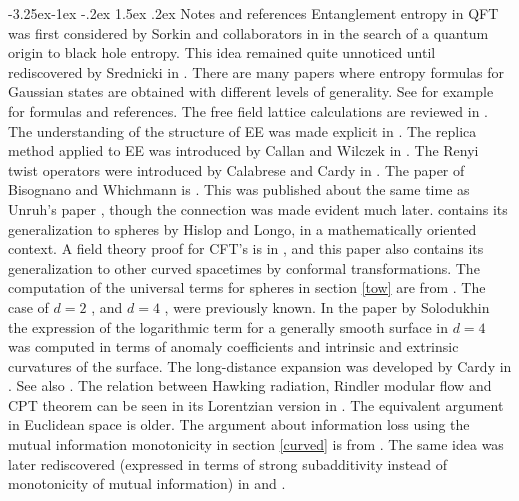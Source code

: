 \documentclass[11pt,a4paper]{article}
\makeatletter
\renewcommand\subsection{\@startsection{subsection}{2}{\z@}%
                                   {-3.25ex\@plus -1ex \@minus -.2ex}%
                                     {1.5ex \@plus .2ex}%
                                     {\normalfont\bfseries}}
\numberwithin{equation}{section}
\makeatother
\begin{document}
\subsection{Notes and references}
Entanglement entropy in QFT was first considered by Sorkin and collaborators in \cite{Sorkin:2014kta,Bombelli:1986rw} in the search of a quantum origin to black hole entropy. This idea remained quite unnoticed until rediscovered by Srednicki in \cite{Srednicki:1993im}. 
There are many papers where entropy formulas for Gaussian states are obtained with different levels of generality. See for example  \cite{peschel2009reduced} for formulas and references. 
The free field lattice calculations are reviewed in \cite{Casini:2009sr}. The understanding of the structure of EE was made explicit in  \cite{Liu:2012eea,Grover:2011fa}. The replica method applied to EE was introduced by Callan and Wilczek in \cite{Callan:1994py}. The Renyi twist operators were introduced by Calabrese and Cardy in \cite{Calabrese:2004eu}. The paper of Bisognano and Whichmann 
 is \cite{Bisognano:1975ih}. This was published about the same time as Unruh's paper  \cite{unruh1976notes}, though the connection was made evident much later.  
 \cite{Hislop:1981uh} contains its generalization to spheres by Hislop and Longo, in a mathematically oriented context. A field theory proof for CFT's is in \cite{Casini:2011kv}, and this paper also contains its generalization to other curved spacetimes by conformal transformations. The computation of the universal terms for spheres in section \ref{tow} are from \cite{Casini:2011kv}. The case of $d=2$ \cite{Holzhey:1994we}, and $d=4$ \cite{Solodukhin:2008dh}, were previously known. In the paper by Solodukhin \cite{Solodukhin:2008dh} the expression of the logarithmic term for a generally smooth surface in $d=4$ was computed in terms of anomaly coefficients and intrinsic and extrinsic curvatures of the surface. The long-distance expansion was developed by Cardy in \cite{Cardy.esferaslejanas}. See also \cite{Agon:2015ftl}. The relation between Hawking radiation, Rindler modular flow and CPT theorem can be seen in its Lorentzian version in \cite{sewell1982quantum}. The equivalent argument in Euclidean space is older. The argument about information loss using the mutual information monotonicity in section \ref{curved} is from \cite{Casini:2007dk}.        The same idea was later rediscovered (expressed in terms of strong subadditivity instead of monotonicity of mutual information) in \cite{Mathur:2009hf} and \cite{Almheiri:2012rt}. 
\end{document}
